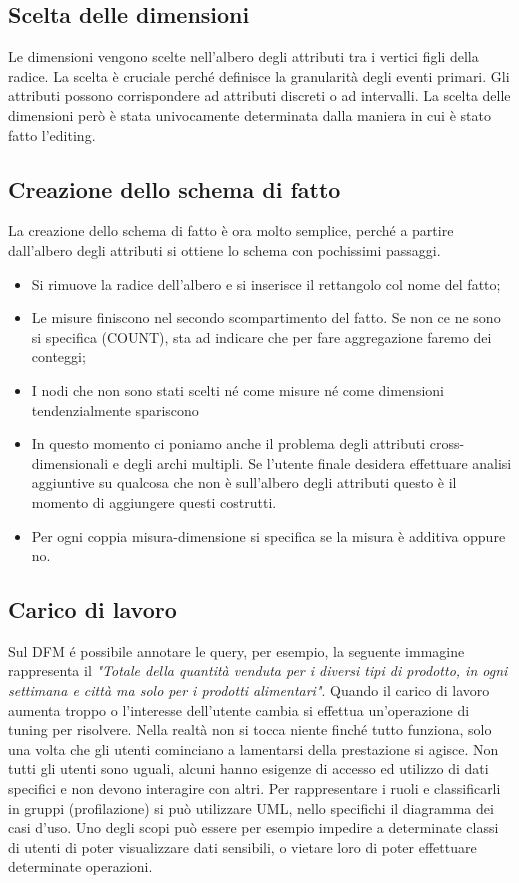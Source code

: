 \subsection{Scelta delle dimensioni}
Le dimensioni vengono scelte nell'albero degli attributi tra i vertici figli della radice. La scelta è cruciale perché definisce la granularità degli eventi primari. Gli attributi possono corrispondere ad attributi discreti o ad intervalli. La scelta delle dimensioni però è stata univocamente determinata dalla maniera in cui è stato fatto l'editing.
\subsection{Creazione dello schema di fatto}
La creazione dello schema di fatto è ora molto semplice, perché a partire dall'albero degli attributi si ottiene lo schema con pochissimi passaggi.
\begin{itemize}
	\item Si rimuove la radice dell'albero e si inserisce il rettangolo col nome del fatto;
	\item Le misure finiscono nel secondo scompartimento del fatto. Se non ce ne sono si specifica (COUNT), sta ad indicare che per fare aggregazione faremo dei conteggi;
	\item I nodi che non sono stati scelti né come misure né come dimensioni tendenzialmente spariscono
	\item In questo momento ci poniamo anche il problema degli attributi cross-dimensionali e degli archi multipli. Se l'utente finale desidera effettuare analisi aggiuntive su qualcosa che non è sull'albero degli attributi questo è il momento di aggiungere questi costrutti.
	\item Per ogni coppia misura-dimensione si specifica se la misura è additiva oppure no.
\end{itemize}
\subsection{Carico di lavoro}
Sul DFM é possibile annotare le query, per esempio, la seguente immagine rappresenta il \textit{"Totale della quantità venduta per i diversi tipi di prodotto, in ogni settimana e città ma solo per i prodotti alimentari"}.
\noindent Quando il carico di lavoro aumenta troppo o l'interesse dell'utente cambia si effettua un'operazione di tuning per risolvere. Nella realtà non si tocca niente finché tutto funziona, solo una volta che gli utenti cominciano a lamentarsi della prestazione si agisce.\newline
Non tutti gli utenti sono uguali, alcuni hanno esigenze di accesso ed utilizzo di dati specifici e non devono interagire con altri. Per rappresentare i ruoli e classificarli in gruppi (profilazione) si può utilizzare UML, nello specifichi il diagramma dei casi d'uso.\newline
Uno degli scopi può essere per esempio impedire a determinate classi di utenti di poter visualizzare dati sensibili, o vietare loro di poter effettuare determinate operazioni.

\newpage
